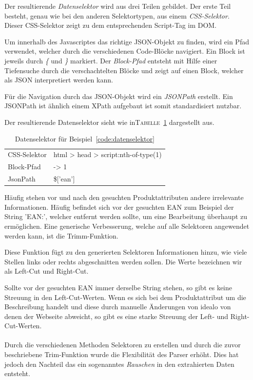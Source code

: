 Der resultierende \textit{Datenselektor} wird aus drei Teilen gebildet.
Der erste Teil besteht, genau wie bei den anderen Selektortypen, aus einem \textit{CSS-Selektor}.
Dieser CSS-Selektor zeigt zu dem entsprechenden Script-Tag im DOM\@.

Um innerhalb des Javascriptes das richtige JSON-Objekt zu finden, wird ein Pfad verwendet, welcher durch die
verschiedenen Code-Blöcke navigiert.
Ein Block ist jeweils durch \textit{\{} und \textit{\}} markiert.
Der \textit{Block-Pfad} entsteht mit Hilfe einer Tiefensuche durch die verschachtelten Blöcke und zeigt auf einen
Block, welcher als JSON interpretiert werden kann.

Für die Navigation durch das JSON-Objekt wird ein \textit{JSONPath} erstellt.
Ein JSONPath ist ähnlich einem XPath aufgebaut ist somit standardisiert nutzbar.

Der resultierende Datenselektor sieht wie in\textsc{Tabelle}~\ref{tab:datenselektor} dargestellt aus.

\begin{table}[h]
    \centering
    \begin{tabular}{ l | l }
        CSS-Selektor &  html > head > script:nth-of-type(1)\\
        Block-Pfad   &  -> 1\\
        JsonPath     &  \$['ean']
    \end{tabular}
    \caption{Datenselektor für Beispiel~\ref{code:datenselektor}}
    \label{tab:datenselektor}
\end{table}

Häufig stehen vor und nach den gesuchten Produktattributen andere irrelevante Informationen.
Häufig befindet sich vor der gesuchten EAN zum Beispiel der String 'EAN:\textvisiblespace', welcher entfernt
werden sollte, um eine Bearbeitung überhaupt zu ermöglichen.
Eine generische Verbesserung, welche auf alle Selektoren angewendet werden kann, ist die Trimm-Funktion.

Diese Funktion fügt zu den generierten Selektoren Informationen hinzu, wie viele Stellen links oder rechts
abgeschnitten werden sollen.
Die Werte bezeichnen wir als Left-Cut und Right-Cut.

Sollte vor der gesuchten EAN immer derselbe String stehen, so gibt es keine Streuung in den Left-Cut-Werten.
Wenn es sich bei dem Produktattribut um die Beschreibung handelt und diese durch manuelle Änderungen von idealo von
denen der Webseite abweicht, so gibt es eine starke Streuung der Left- und Right-Cut-Werten.
\\
~~\\
Durch die verschiedenen Methoden Selektoren zu erstellen und durch die zuvor beschriebene Trim-Funktion wurde die
Flexibilität des Parser erhöht.
Dies hat jedoch den Nachteil das ein sogenanntes \textit{Rauschen} in den extrahierten Daten entsteht.


